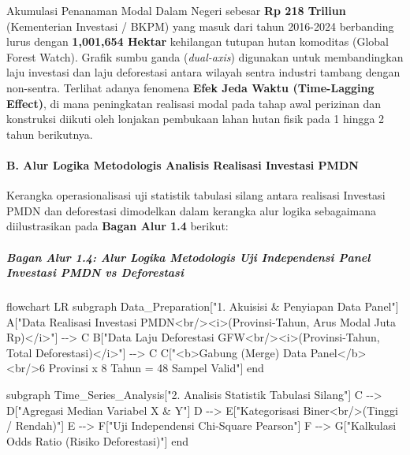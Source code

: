 \documentclass[
]{article}
\newenvironment{Shaded}{}{}
\newcommand{\NormalTok}[1]{#1}
\begin{document}
Akumulasi Penanaman Modal Dalam Negeri sebesar \textbf{Rp 218 Triliun}
(Kementerian Investasi / BKPM) yang masuk dari tahun 2016-2024
berbanding lurus dengan \textbf{1,001,654 Hektar} kehilangan tutupan
hutan komoditas (Global Forest Watch). Grafik sumbu ganda
(\emph{dual-axis}) digunakan untuk membandingkan laju investasi dan laju
deforestasi antara wilayah sentra industri tambang dengan non-sentra.
Terlihat adanya fenomena \textbf{Efek Jeda Waktu (Time-Lagging Effect)},
di mana peningkatan realisasi modal pada tahap awal perizinan dan
konstruksi diikuti oleh lonjakan pembukaan lahan hutan fisik pada 1
hingga 2 tahun berikutnya.

\paragraph{B. Alur Logika Metodologis Analisis Realisasi Investasi
PMDN}\label{b.-alur-logika-metodologis-analisis-realisasi-investasi-pmdn}

Kerangka operasionalisasi uji statistik tabulasi silang antara realisasi
Investasi PMDN dan deforestasi dimodelkan dalam kerangka alur logika
sebagaimana diilustrasikan pada \textbf{Bagan Alur 1.4} berikut:

\subparagraph{Bagan Alur 1.4: Alur Logika Metodologis Uji Independensi
Panel Investasi PMDN vs
Deforestasi}\label{bagan-alur-1.4-alur-logika-metodologis-uji-independensi-panel-investasi-pmdn-vs-deforestasi}

\begin{Shaded}
\begin{Highlighting}[]
\NormalTok{flowchart LR}
\NormalTok{    subgraph Data\_Preparation["1. Akuisisi \& Penyiapan Data Panel"]}
\NormalTok{        A["Data Realisasi Investasi PMDN\textless{}br/\textgreater{}\textless{}i\textgreater{}(Provinsi{-}Tahun, Arus Modal Juta Rp)\textless{}/i\textgreater{}"] {-}{-}\textgreater{} C}
\NormalTok{        B["Data Laju Deforestasi GFW\textless{}br/\textgreater{}\textless{}i\textgreater{}(Provinsi{-}Tahun, Total Deforestasi)\textless{}/i\textgreater{}"] {-}{-}\textgreater{} C}
\NormalTok{        C["\textless{}b\textgreater{}Gabung (Merge) Data Panel\textless{}/b\textgreater{}\textless{}br/\textgreater{}6 Provinsi x 8 Tahun = 48 Sampel Valid"]}
\NormalTok{    end}

\NormalTok{    subgraph Time\_Series\_Analysis["2. Analisis Statistik Tabulasi Silang"]}
\NormalTok{        C {-}{-}\textgreater{} D["Agregasi Median Variabel X \& Y"]}
\NormalTok{        D {-}{-}\textgreater{} E["Kategorisasi Biner\textless{}br/\textgreater{}(Tinggi / Rendah)"]}
\NormalTok{        E {-}{-}\textgreater{} F["Uji Independensi Chi{-}Square Pearson"]}
\NormalTok{        F {-}{-}\textgreater{} G["Kalkulasi Odds Ratio (Risiko Deforestasi)"]}
\NormalTok{    end}
\end{Highlighting}
\end{Shaded}
\end{document}
